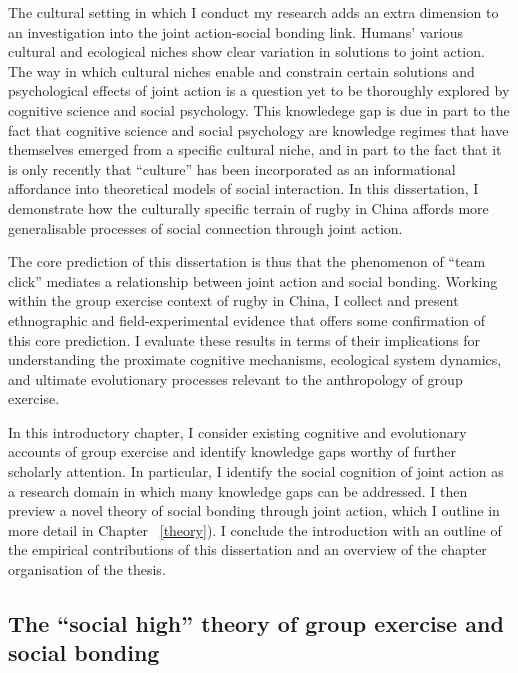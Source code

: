 \begin{CJK}{UTF8}{gbsn}
The cultural setting in which I conduct my research adds an extra dimension to an investigation into the joint action-social bonding link. Humans' various cultural and ecological niches show clear variation in solutions to joint action.  The way in which cultural niches enable and constrain certain solutions and psychological effects of joint action is a question yet to be thoroughly explored by cognitive science and social psychology.  This knowledege gap is due in part to the fact that cognitive science and social psychology are knowledge regimes that have themselves emerged from a specific cultural niche, and in part to the fact that it is only recently that ``culture'' has been incorporated as an informational affordance into theoretical models of social interaction. In this dissertation, I demonstrate how the culturally specific terrain of rugby in China affords more generalisable processes of social connection through joint action.

The core prediction of this dissertation is thus that the phenomenon of ``team click'' mediates a relationship between joint action and social bonding.  Working within the group exercise context of rugby in China, I collect and present ethnographic and field-experimental evidence that offers some confirmation of this core prediction.  I evaluate these results in terms of their implications for understanding the proximate cognitive mechanisms, ecological system dynamics, and ultimate evolutionary processes relevant to the anthropology of group exercise.

In this introductory chapter, I consider existing cognitive and evolutionary accounts of group exercise and identify knowledge gaps worthy of further scholarly attention.  In particular, I identify the  social cognition of joint action as a research domain in which many knowledge gaps can be addressed.  I then preview a novel theory of social bonding through joint action, which I outline in more detail in Chapter ~\ref{theory}).  I conclude the introduction with an outline of the empirical contributions of this dissertation and an overview of the chapter organisation of the thesis.


\subsection{The ``social high'' theory of group exercise and social bonding}


\end{CJK}
